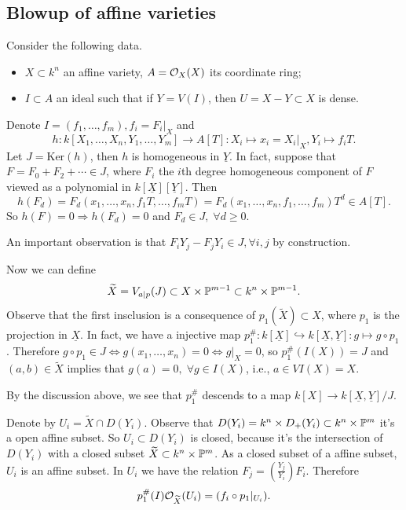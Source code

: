 \subsection{Blowup of affine varieties}
Consider the following data. 
\begin{itemize}
    \item $X\subset k^n$ an affine variety, $A=\mathcal{O}_X(X)$ its coordinate ring;
    \item $I\subset A$ an ideal such that if $Y=V(I)$, then $U = X-Y\subset X$ is dense.
\end{itemize}
Denote $I=(f_1,\dots, f_m),f_i = F_i|_X$ and 
\begin{equation}
    h:k[X_1,\dots,X_n,Y_1,\dots,Y_m]\rightarrow A[T]:X_i\mapsto x_i = X_i|_X, Y_i\mapsto f_iT.
\end{equation}
Let $J=\text{Ker}(h)$, then $h$ is homogeneous in $\underline{Y}$. In fact, suppose that 
$F = F_0+F_2+\cdots\in J$, where $F_i$ the $i$th degree homogeneous component of $F$ viewed as a polynomial in 
$k[\underline{X}][\underline{Y}]$. Then 
\begin{equation}
    h(F_d) = F_d(x_1,\dots, x_n, f_1T,\dots, f_mT)=F_d(x_1,\dots,x_n,f_1,\dots,f_m)T^d\in A[T].
\end{equation}
So $h(F)=0\Rightarrow h(F_d)=0$ and $F_d\in J,\;\forall d\geq0$. 
\begin{remark}
    An important observation is that $F_iY_j - F_jY_i\in J,\forall i,j$ by construction.
\end{remark}
Now we can define 
\begin{equation}
    \widetilde{X} = V_{a|p}(J)\subset X\times\mathbb{P}^{m-1}\subset k^n\times\mathbb{P}^{m-1}.
\end{equation}
Observe that the first insclusion is a consequence of $p_1(\widetilde{X})\subset X$, where $p_1$ is the projection 
in $\underline{X}$. In fact, we have a injective map 
$p_1^\#:k[\underline{X}]\hookrightarrow k[\underline{X},\underline{Y}]:g\mapsto g\circ p_1$. Therefore 
$g\circ p_1\in J\iff g(x_1,\dots,x_n)=0\iff g|_X=0$, so $p_1^\# (I(X)) = J$ and $(a,b)\in\widetilde{X}$ implies that 
$g(a)=0,\;\forall g\in I(X)$, i.e., $a\in VI(X)=X$. 

\begin{remark}
By the discussion above, we see that 
$p_1^\#$ descends to a map $k[X]\to k[\underline{X},\underline{Y}]/J$.
\end{remark}

\begin{remark}\label{remark: U_i is affine}
    Denote by $U_i = \widetilde{X}\cap D(Y_i)$. Observe that $D(Y_i) = k^n\times D_+(Y_i)\subset k^n\times\mathbb{P}^m$ it's 
a open affine subset. So $U_i\subset D(Y_i)$ is closed, because it's the intersection of $D(Y_i)$ with a closed 
subset $\widetilde{X}\subset k^n\times\mathbb{P}^m$. As a closed subset of a affine subset, $U_i$ is an affine subset. 
In $U_i$ we have the relation $F_j = (\tfrac{Y_j}{Y_i})F_i$. Therefore 
\begin{equation}
    p_1^\#(I)\mathcal{O}_{\widetilde{X}}(U_i) = (f_i\circ p_1|_{U_i}).
\end{equation}
\end{remark}



